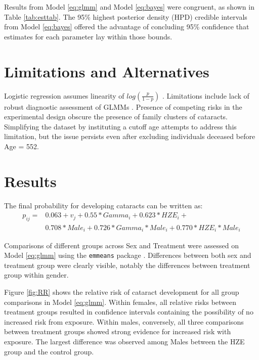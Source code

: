 \documentclass[12pt]{article}
\begin{document}
Results from Model \eqref{eq:glmm} and Model \eqref{eq:bayes} were congruent, as shown in Table \ref{tab:esttab}. The 95\% highest posterior density (HPD) credible intervals from Model \eqref{eq:bayes} offered the advantage of concluding 95\% confidence that estimates for each parameter lay within those bounds.

\section{Limitations and Alternatives}
\label{sec:limits}

Logistic regression assumes linearity of \(log(\frac{p}{1-p})\) \citep{BMLR2021}. Limitations include lack of robust diagnostic assessment of GLMMs \citep{CDA}. Presence of competing risks in the experimental design obscure the presence of family clusters of cataracts. Simplifying the dataset by instituting a cutoff age attempts to address this limitation, but the issue persists even after excluding individuals deceased before Age = 552.

\section{Results}
\label{sec:results}

The final probability for developing cataracts can be written as:\\
\begin{equation}
\begin{aligned}
p_{ij} = &0.063 + v_j + 0.55*Gamma_i + 0.623*HZE_i + \\
&0.708*Male_i + 0.726*Gamma_i*Male_i + 0.770*HZE_i*Male_i
\end{aligned}
\label{eq:probs}
\end{equation}

Comparisons of different groups across Sex and Treatment were assessed on Model \eqref{eq:glmm} using the \texttt{emmeans} package \citep{R-emmeans}. Differences between both sex and treatment group were clearly visible, notably the differences between treatment group within gender.

Figure \ref{fig:RR} shows the relative risk of cataract development for all group comparisons in Model \eqref{eq:glmm}. Within females, all relative risks between treatment groups resulted in confidence intervals containing the possibility of no increased risk from exposure. Within males, conversely, all three comparisons between treatment groups showed strong evidence for increased risk with exposure. The largest difference was observed among Males between the HZE group and the control group.
\end{document}
